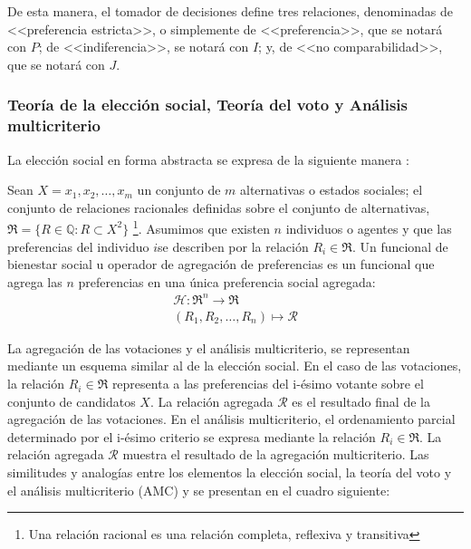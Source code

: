 \documentclass[a5paper,doc,10pt,noapacite]{apa6}
\begin{document}
{{	De esta manera, el tomador de decisiones define tres relaciones, denominadas de <<preferencia estricta>>, o simplemente de <<preferencia>>, que se notará con \(P\); de <<indiferencia>>, se notará con \(I\); y, de <<no comparabilidad>>, que se notará con \(J\).
	
	\subsubsection{Teoría de la elección social, Teoría del voto y Análisis multicriterio}
	
	La elección social en forma abstracta se expresa de la siguiente manera \cite{Colell-1995}: 

Sean \(X = x_1, x_2,\dots, x_m\) un conjunto de \(m\) alternativas o estados sociales; el conjunto de relaciones racionales definidas sobre el conjunto de alternativas, \(\Re = \{ R\in \mathbb{Q}: R \subset X^2\}\) \footnote{Una relación racional es una relación completa, reflexiva y transitiva}.  Asumimos que existen \(n\) individuos o agentes y que las preferencias del individuo \(i\)se describen por la relación \(R_i \in \Re\). Un funcional de bienestar social u operador de agregación de preferencias es un funcional que agrega las \(n\) preferencias en una única preferencia social agregada:
	\begin{align*}
	 \mathcal{H} : \Re ^n \longrightarrow \Re \\
    (R_1, R_2, \dots, R_n) \mapsto \mathcal{R}
	\end{align*}

	La agregación de las votaciones y el análisis multicriterio, se representan mediante un esquema similar al de la elección social. En el caso de las votaciones, la relación \(R_i \in \Re\) representa a las preferencias del i-ésimo votante sobre el conjunto de candidatos \(X\). La
relación agregada \(\mathcal{R}\) es el resultado final de la agregación de las votaciones. En el análisis multicriterio, el ordenamiento parcial determinado por el i-ésimo criterio se expresa mediante la relación \(R_i \in \Re\). La relación agregada \(\mathcal{R}\) muestra el resultado de la agregación multicriterio.
Las similitudes y analogías entre los elementos la elección social, la teoría del voto y el análisis multicriterio (AMC) y se presentan en el cuadro siguiente:


}}
\end{document}
